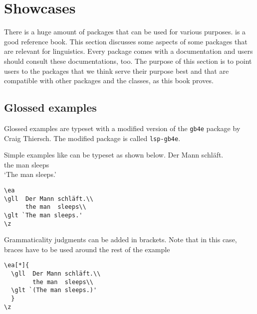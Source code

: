 \chapter{Showcases}

There is a huge amount of packages that can be used for various purposes. \citet{MG2013a} is a good
reference book. This section discusses some aspects of some packages that are relevant for
linguistics. Every \latex package comes with a documentation and users should consult these
documentations, too. The purpose of this section is to point users to the packages that we think
serve their purpose best and that are compatible with other packages and the \lsp classes, as this
book proves.

\section{Glossed examples}

Glossed examples are typeset with a modified version of the \texttt{gb4e} package by Craig
Thiersch. The modified package is called \texttt{lsp-gb4e}. 

Simple examples like  can be typeset as shown below.
\ea\label{ex:showcases:simple}
\gll Der Mann schläft.\\
     the man  sleeps\\
\glt `The man sleeps.'
\z
\begin{verbatim}
\ea
\gll  Der Mann schläft.\\
      the man  sleeps\\
\glt `The man sleeps.'
\z
\end{verbatim}

Grammaticality judgments can be added in brackets. Note that in this case, braces have to be used around the rest of the example
\z
 
\newpage
\begin{verbatim}
\ea[*]{
  \gll  Der Mann schläft.\\
        the man  sleeps\\
  \glt `(The man sleeps.)'
  }
\z
\end{verbatim} 

